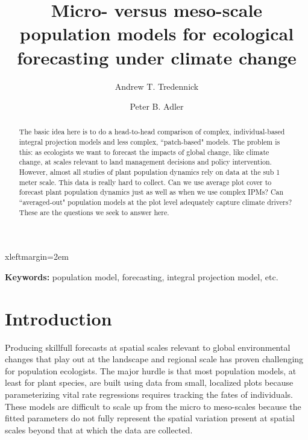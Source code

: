 \documentclass[12pt]{article}
\begin{document}



 {xleftmargin=2em}

\title{\LARGE Micro- versus meso-scale population models for ecological forecasting under climate change}
\author[1]{\large Andrew T. Tredennick} 
\author[1]{\large Peter B. Adler}
\maketitle

\begin{abstract}
The basic idea here is to do a head-to-head comparison of complex, individual-based integral projection models and less complex, ``patch-based" models. The problem is this: as ecologists we want to forecast the impacts of global change, like climate change, at scales relevant to land management decisions and policy intervention. However, almost all studies of plant population dynamics rely on data at the sub 1 meter scale. This data is really hard to collect. Can we use average plot cover to forecast plant population dynamics just as well as when we use complex IPMs? Can ``averaged-out" population models at the plot level adequately capture climate drivers? These are the questions we seek to answer here.
\end{abstract}

\noindent{}\footnotesize{\textbf{Keywords:} population model, forecasting, integral projection model, etc.}

\section{Introduction}
Producing skillfull forecasts at spatial scales relevant to global environmental changes that play out at the landscape and regional scale has proven challenging for population ecologists. The major hurdle is that most population models, at least for plant species, are built using data from small, localized plots because parameterizing vital rate regressions requires tracking the fates of individuals. These models are difficult to scale up from the micro to meso-scales because the fitted parameters do not fully represent the spatial variation present at spatial scales beyond that at which the data are collected. 
\end{document}
